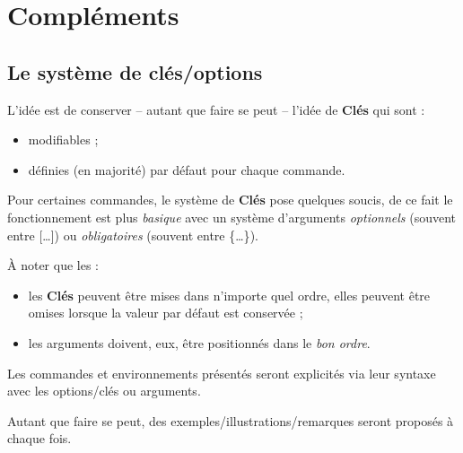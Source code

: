 \documentclass[a4paper,french,11pt]{article}
\newcommand\Cle[1]{{\bfseries\sffamily\textlangle #1\textrangle}}
\begin{document}

\pagebreak

\section{Compléments}

\subsection{Le système de \og clés/options \fg}

\begin{tipblock}
L'idée est de conserver -- autant que faire se peut -- l'idée de \Cle{Clés} qui sont :
%
\begin{itemize}
	\item modifiables ;
	\item définies (en majorité) par défaut pour chaque commande.
\end{itemize}

Pour certaines commandes, le système de \Cle{Clés} pose quelques soucis, de ce fait le fonctionnement est plus \textit{basique} avec un système d'\textsf{arguments} \textit{optionnels} (souvent entre \textsf{[\ldots]}) ou \textit{obligatoires} (souvent entre \textsf{\{\ldots\}}).

\smallskip

À noter que les :
%
\begin{itemize}
	\item les \Cle{Clés} peuvent être mises dans n'importe quel ordre, elles peuvent être omises lorsque la valeur par défaut est conservée ;
	\item les \textsf{arguments} doivent, eux, être positionnés dans le \textit{bon ordre}.
\end{itemize}
\vspace*{-\baselineskip}\leavevmode
\end{tipblock}

\begin{noteblock}
Les \textsf{commandes} et \textsf{environnements} présentés seront explicités via leur \textsf{syntaxe} avec les \textsf{options/clés} ou \textsf{arguments}.

Autant que faire se peut, des exemples/illustrations/remarques seront proposés à chaque fois.
\end{noteblock}
\end{document}
